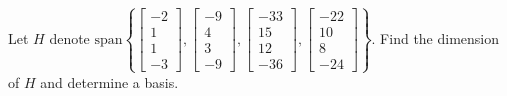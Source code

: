 \documentclass{ximera}
\begin{document}


\begin{problem}\label{prb:5.3} Let $H$ denote $\mbox{span}\left\{ \left[
\begin{array}{r}
-2 \\
1 \\
1 \\
-3
\end{array}
\right] ,\left[
\begin{array}{r}
-9 \\
4 \\
3 \\
-9
\end{array}
\right] ,\left[
\begin{array}{r}
-33 \\
15 \\
12 \\
-36
\end{array}
\right] ,\left[
\begin{array}{r}
-22 \\
10 \\
8 \\
-24
\end{array}
\right] \right\} .$ Find the dimension of $H$ and determine a basis.
\end{problem}
\end{document}
